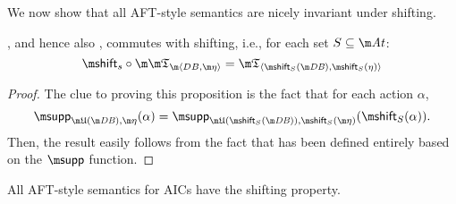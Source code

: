 We now show that all AFT-style semantics are nicely invariant under shifting. 
\begin{proposition}
 \Ap, and hence also \Op, commutes with shifting, i.e., for each set $S\subseteq \atoms$:
 \[\shift_s \circ \Apfull = \threeap_{\langle\shift_S(\db),\shift_S(\eta)\rangle}\]
\end{proposition}
\begin{proof}
The clue to proving this proposition is the fact that for each action $\alpha$, 
\[\supp_{\UUU(\db),\aics}(\alpha) = \supp_{\UUU(\shift_S(\db)),\shift_S(\aics)}(\shift_S(\alpha)).\]
Then, the result easily follows from the fact that \Ap has been defined entirely based on the $\supp$ function.  
\end{proof}

\begin{corollary}
 All AFT-style semantics for AICs have the shifting property. 
\end{corollary}

